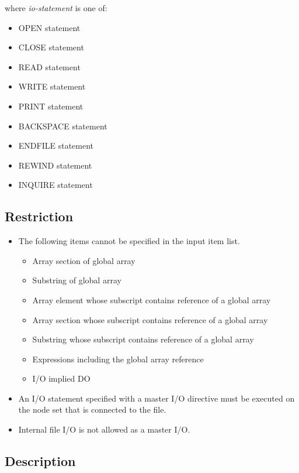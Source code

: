    where {\it io-statement} is one of:

   \begin{itemize}
    \item OPEN statement
    \item CLOSE statement
    \item READ statement
    \item WRITE statement
    \item PRINT statement
    \item BACKSPACE statement
    \item ENDFILE statement
    \item REWIND statement
    \item INQUIRE statement
   \end{itemize}

   \subsection*{Restriction}
   \begin{itemize}
    \item The following items cannot be specified in the input item list.

	  \begin{itemize}
	   \item Array section of global array
	   \item Substring of global array
	   \item Array element whose subscript contains reference of a
		 global array
	   \item Array section whose subscript contains reference of a
		 global array
	   \item Substring whose subscript contains reference of a
		 global array
	   \item Expressions including the global array reference
	   \item I/O implied DO
	  \end{itemize}

    \item An I/O statement specified with a master I/O directive must be
	  executed on the node set that is connected to the file.
    \item Internal file I/O is not allowed as a master I/O.
   \end{itemize}
	  
  \subsection*{Description}

